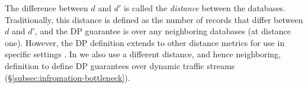The difference between $d$ and $d'$ is called the {\em
distance} between the databases.
Traditionally, this distance is defined as the number of records that differ between $d$ and $d'$, and the DP guarantee is over any neighboring databases (at distance one).
However, the DP definition extends to other distance metrics for use in specific settings \cite{chatzikokolakis2013broadening, lecuyer2019certified}.
In {\sys} we also use a different distance, and hence neighboring, definition to define DP guarantees over dynamic traffic streams (\S\ref{subsec:infromation-bottleneck}).


